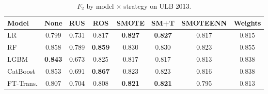 \begin{table}[ht!]
\centering
\caption{$F_2$ by model $\times$ strategy on ULB 2013.}
\label{tab:factorial_ulb_f2}
\begin{tabular}{l c c c c c c c}
\toprule
Model & None & RUS & ROS & SMOTE & SM+T & SMOTEENN & Weights \\
\midrule
LR         & 0.799 & 0.731 & 0.817 & \textbf{0.827} & \textbf{0.827} & 0.817 & 0.815 \\
RF         & 0.858 & 0.789 & \textbf{0.859} & 0.830 & 0.830 & 0.823 & 0.855 \\
LGBM       & \textbf{0.843} & 0.673 & 0.825 & 0.817 & 0.817 & 0.813 & 0.838 \\
CatBoost   & 0.853 & 0.691 & \textbf{0.867} & 0.823 & 0.823 & 0.816 & 0.838 \\
FT-Trans.  & 0.807 & 0.704 & 0.808 & \textbf{0.821} & \textbf{0.821} & 0.795 & 0.813 \\
\bottomrule
\end{tabular}
\end{table}